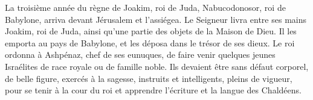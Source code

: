 La troisième année du règne de Joakim, roi de Juda,
	Nabucodonosor, roi de Babylone, arriva devant Jérusalem et l’assiégea.
Le Seigneur livra entre ses mains Joakim, roi de Juda,
	ainsi qu’une partie des objets de la Maison de Dieu.
Il les emporta au pays de Babylone, et les déposa dans le trésor de ses dieux.
Le roi ordonna à Ashpénaz, chef de ses eunuques,
	de faire venir quelques jeunes Israélites de race royale ou de famille noble.
Ils devaient être sans défaut corporel, de belle figure,
	exercés à la sagesse, instruits et intelligents, pleins de vigueur,
	pour se tenir à la cour du roi et apprendre l’écriture et la langue des Chaldéens.
